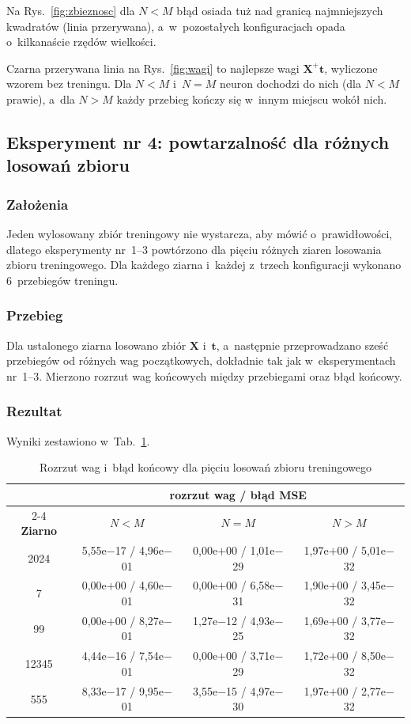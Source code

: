 \documentclass[12pt]{article}
\begin{document}
Na Rys.~\ref{fig:zbieznosc} dla $N<M$ błąd osiada tuż nad granicą najmniejszych
kwadratów (linia przerywana), a~w~pozostałych konfiguracjach opada o~kilkanaście
rzędów wielkości.

Czarna przerywana linia na Rys.~\ref{fig:wagi} to najlepsze wagi
$\mathbf{X}^{+}\mathbf{t}$, wyliczone wzorem bez treningu. Dla $N<M$ i~$N=M$ neuron
dochodzi do nich (dla $N<M$ prawie), a~dla $N>M$ każdy przebieg kończy się w~innym
miejscu wokół nich.

\subsection{Eksperyment nr 4: powtarzalność dla różnych losowań zbioru}

\subsubsection{Założenia}
Jeden wylosowany zbiór treningowy nie wystarcza, aby mówić o~prawidłowości, dlatego
eksperymenty nr~1--3 powtórzono dla pięciu różnych ziaren losowania zbioru
treningowego. Dla każdego ziarna i~każdej z~trzech konfiguracji wykonano 6~przebiegów
treningu.

\subsubsection{Przebieg}
Dla ustalonego ziarna losowano zbiór $\mathbf{X}$ i~$\mathbf{t}$, a~następnie
przeprowadzano sześć przebiegów od różnych wag początkowych, dokładnie tak jak
w~eksperymentach nr~1--3. Mierzono rozrzut wag końcowych między przebiegami oraz
błąd końcowy.

\subsubsection{Rezultat}
Wyniki zestawiono w~Tab.~\ref{tab:ziarna}.

\begin{table}[h]
\centering
\caption{Rozrzut wag i~błąd końcowy dla pięciu losowań zbioru treningowego}
\label{tab:ziarna}
\small
\begin{tabular}{cccc}
\toprule
 & \multicolumn{3}{c}{\textbf{rozrzut wag / błąd MSE}} \\
\cmidrule(l){2-4}
\textbf{Ziarno} & $N<M$ & $N=M$ & $N>M$ \\
\midrule
2024  & 5,55e$-$17 / 4,96e$-$01 & 0,00e$+$00 / 1,01e$-$29 & 1,97e$+$00 / 5,01e$-$32 \\
7     & 0,00e$+$00 / 4,60e$-$01 & 0,00e$+$00 / 6,58e$-$31 & 1,90e$+$00 / 3,45e$-$32 \\
99    & 0,00e$+$00 / 8,27e$-$01 & 1,27e$-$12 / 4,93e$-$25 & 1,69e$+$00 / 3,77e$-$32 \\
12345 & 4,44e$-$16 / 7,54e$-$01 & 0,00e$+$00 / 3,71e$-$29 & 1,72e$+$00 / 8,50e$-$32 \\
555   & 8,33e$-$17 / 9,95e$-$01 & 3,55e$-$15 / 4,97e$-$30 & 1,97e$+$00 / 2,77e$-$32 \\
\bottomrule
\end{tabular}
\end{table}
\end{document}
